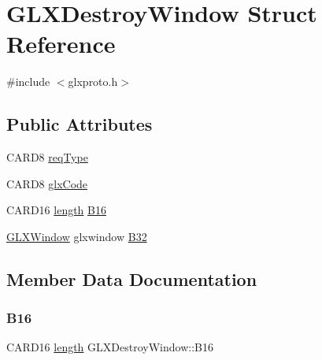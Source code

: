 \hypertarget{struct_g_l_x_destroy_window}{}\section{G\+L\+X\+Destroy\+Window Struct Reference}
\label{struct_g_l_x_destroy_window}


{\ttfamily \#include $<$glxproto.\+h$>$}

\subsection*{Public Attributes}
\begin{DoxyCompactItemize}
\item 
C\+A\+R\+D8 \hyperlink{struct_g_l_x_destroy_window_ac945cf4300abf273b50823457831b71e}{req\+Type}
\item 
C\+A\+R\+D8 \hyperlink{struct_g_l_x_destroy_window_a0ed2d05a4efaded603dcb4b00000f9b8}{glx\+Code}
\item 
C\+A\+R\+D16 \hyperlink{glcorearb_8h_ab9c919755bde3b34349e23a32b4e0fa7}{length} \hyperlink{struct_g_l_x_destroy_window_a3b3ede8631eb0d3f04c3bbda6fba2d4b}{B16}
\item 
\hyperlink{glx_8h_a7b7fbb726212feadef35c6c7c09b9541}{G\+L\+X\+Window} glxwindow \hyperlink{struct_g_l_x_destroy_window_a1d7ccc518bb496e3887f126951f171a3}{B32}
\end{DoxyCompactItemize}


\subsection{Member Data Documentation}
\mbox{\label{struct_g_l_x_destroy_window_a3b3ede8631eb0d3f04c3bbda6fba2d4b}} 
\subsubsection{\texorpdfstring{B16}{B16}}
{\footnotesize\ttfamily C\+A\+R\+D16 \hyperlink{glcorearb_8h_ab9c919755bde3b34349e23a32b4e0fa7}{length} G\+L\+X\+Destroy\+Window\+::\+B16}

\mbox{\label{struct_g_l_x_destroy_window_a1d7ccc518bb496e3887f126951f171a3}} 
